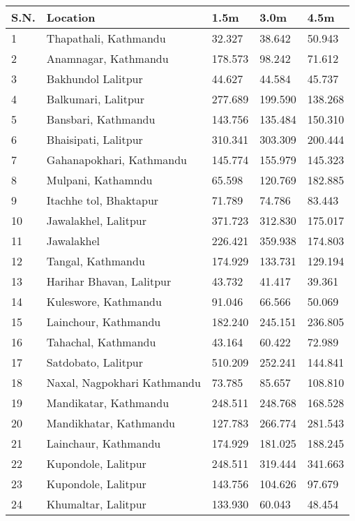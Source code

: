 \begin{tabularx}{\textwidth}{ | l | p{} | X | X | X | }
\hline
 \textbf{S.N.} & \textbf{Location} & \textbf{1.5m} & \textbf{3.0m} & \textbf{4.5m}\\
\hline
 1 & Thapathali, Kathmandu & 32.327 & 38.642 & 50.943 \\
 2 & Anamnagar, Kathmandu & 178.573 & 98.242 & 71.612 \\
 3 & Bakhundol Lalitpur & 44.627 & 44.584 & 45.737 \\
 4 & Balkumari, Lalitpur & 277.689 & 199.590 & 138.268 \\
 5 & Bansbari, Kathmandu & 143.756 & 135.484 & 150.310 \\
 6 & Bhaisipati, Lalitpur & 310.341 & 303.309 & 200.444 \\
 7 & Gahanapokhari, Kathmandu & 145.774 & 155.979 & 145.323 \\
 8 & Mulpani, Kathamndu  & 65.598 & 120.769 & 182.885 \\
 9 & Itachhe tol, Bhaktapur & 71.789 & 74.786 & 83.443 \\
 10 & Jawalakhel, Lalitpur  & 371.723 & 312.830 & 175.017 \\
 11 & Jawalakhel & 226.421 & 359.938 & 174.803 \\
 12 & Tangal, Kathmandu & 174.929 & 133.731 & 129.194 \\
 13 & Harihar Bhavan, Lalitpur & 43.732 & 41.417 & 39.361 \\
 14 & Kuleswore, Kathmandu & 91.046 & 66.566 & 50.069 \\
 15 & Lainchour, Kathmandu & 182.240 & 245.151 & 236.805 \\
 16 & Tahachal, Kathmandu & 43.164 & 60.422 & 72.989 \\
 17 & Satdobato, Lalitpur & 510.209 & 252.241 & 144.841 \\
 18 & Naxal, Nagpokhari Kathmandu  & 73.785 & 85.657 & 108.810 \\
 19 & Mandikatar, Kathmandu  & 248.511 & 248.768 & 168.528 \\
 20 & Mandikhatar, Kathmandu  & 127.783 & 266.774 & 281.543 \\
 21 & Lainchaur, Kathmandu  & 174.929 & 181.025 & 188.245 \\
 22 & Kupondole, Lalitpur & 248.511 & 319.444 & 341.663 \\
 23 & Kupondole, Lalitpur & 143.756 & 104.626 & 97.679 \\
 24 & Khumaltar, Lalitpur & 133.930 & 60.043 & 48.454 \\

\end{tabularx}
